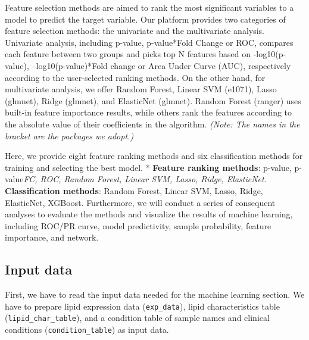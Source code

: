\documentclass[]{article}
\begin{document}
Feature selection methods are aimed to rank the most significant variables to a model to predict the target variable. Our platform provides two categories of feature selection methods: the univariate and the multivariate analysis. Univariate analysis, including p-value, p-value*Fold Change or ROC, compares each feature between two groups and picks top N features based on -log10(p-value), --log10(p-value)*Fold change or Area Under Curve (AUC), respectively according to the user-selected ranking methods. On the other hand, for multivariate analysis, we offer Random Forest, Linear SVM (e1071), Lasso (glmnet), Ridge (glmnet), and ElasticNet (glmnet). Random Forest (ranger) uses built-in feature importance results, while others rank the features according to the absolute value of their coefficients in the algorithm. \emph{(Note: The names in the bracket are the packages we adopt.)}

Here, we provide eight feature ranking methods and six classification methods for training and selecting the best model.
* \textbf{Feature ranking methods}: p-value, p-value\emph{FC, ROC, Random Forest, Linear SVM, Lasso, Ridge, ElasticNet.
} \textbf{Classification methods}: Random Forest, Linear SVM, Lasso, Ridge, ElasticNet, XGBoost.
Furthermore, we will conduct a series of consequent analyses to evaluate the methods and visualize the results of machine learning, including ROC/PR curve, model predictivity, sample probability, feature importance, and network.

\hypertarget{input-data-2}{%
\subsection{Input data}\label{input-data-2}}

First, we have to read the input data needed for the machine learning section. We have to prepare lipid expression data (\texttt{exp\_data}), lipid characteristics table (\texttt{lipid\_char\_table}), and a condition table of sample names and clinical conditions (\texttt{condition\_table}) as input data.
\end{document}

